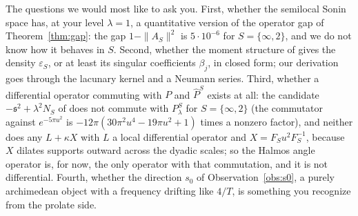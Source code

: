 \documentclass[11pt]{amsart}
\theoremstyle{definition}
\theoremstyle{remark}
\newcommand{\Pih}{\widehat P}
\begin{document}
The questions we would most like to ask you. First, whether the semilocal Sonin space has, at your level $\lambda=1$, a
quantitative version of the operator gap of Theorem~\ref{thm:gap}: the gap $1-\|A_S\|^2$ is $5\cdot10^{-6}$ for $S=\{\infty,2\}$,
and we do not know how it behaves in $S$. Second, whether the moment structure of \cite{CCM2024} gives the density
$\varepsilon_S$, or at least its singular coefficients $\beta_j$, in closed form; our derivation goes through the lacunary kernel
and a Neumann series. Third, whether a differential operator commuting with $P$ and $\Pih^S$ exists at all: the candidate
$-\mathfrak s^2+\lambda^2N_S$ of \cite{CCM2023} does not commute with $P_\lambda^S$ for $S=\{\infty,2\}$ (the commutator against
$e^{-5\pi u^2}$ is $-12\pi(30\pi^2u^4-19\pi u^2+1)$ times a nonzero factor), and neither does any $L+\kappa X$ with $L$ a local
differential operator and $X=F_Su^2F_S^{-1}$, because $X$ dilates supports outward across the dyadic scales; so the Halmos
angle operator is, for now, the only operator with that commutation, and it is not differential. Fourth, whether the
direction $s_0$ of Observation~\ref{obs:s0}, a purely archimedean object with a frequency drifting like $4/T$, is something you
recognize from the prolate side.
\end{document}

